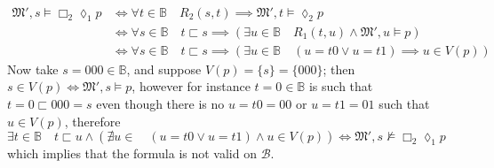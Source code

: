 \documentclass[a4paper, 12pt]{report}
\begin{document}
{\begin{enumerate}[label=(\alph*)]
\begin{itemize}
\begin{equation*}
\begin{split}
                                \mathfrak M', s \models \Box_2 \lozenge_1 p &\iff \forall t \in \mathbb B \quad R_2(s, t) \implies \mathfrak M', t \models \lozenge_2 p \\
                                                                            &\iff \forall s \in \mathbb B \quad t \sqsubset s \implies (\exists u \in \mathbb B \quad R_1(t, u) \land \mathfrak M', u \models p) \\
                                                                            &\iff \forall s \in \mathbb B \quad t \sqsubset s \implies (\exists u \in \mathbb B \quad (u = t0 \lor u = t1) \implies u \in V(p))
                            \end{split}
                        \end{equation*}
                        Now take $s = 000 \in \mathbb B$, and suppose $V(p) = \{s\} = \{000\}$; then $s \in V(p) \iff \mathfrak M', s \models p$, however for instance $t = 0 \in \mathbb B$ is such that $t = 0 \sqsubset 000 = s$ even though there is no $u = t0 = 00$ or $u = t1 = 01$ such that $u \in V(p)$, therefore $\exists t \in \mathbb B \quad t \sqsubset u \land (\nexists u \in \mathbb \quad (u = t0 \lor u = t1) \land u \in V(p)) \iff \mathfrak M', s \not\models \Box_2 \lozenge_1 p$ which implies that the formula is not valid on $\mathcal B$.
                \end{itemize}
        \end{enumerate}
    }

\end{document}
